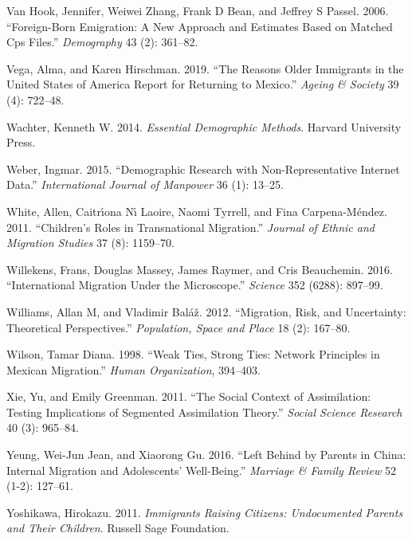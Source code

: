 \documentclass[
]{article}
\begin{document}
\leavevmode\hypertarget{ref-van2006foreign}{}%
Van Hook, Jennifer, Weiwei Zhang, Frank D Bean, and Jeffrey S Passel.
2006. ``Foreign-Born Emigration: A New Approach and Estimates Based on
Matched Cps Files.'' \emph{Demography} 43 (2): 361--82.

\leavevmode\hypertarget{ref-vega2019reasons}{}%
Vega, Alma, and Karen Hirschman. 2019. ``The Reasons Older Immigrants in
the United States of America Report for Returning to Mexico.''
\emph{Ageing \& Society} 39 (4): 722--48.

\leavevmode\hypertarget{ref-wachter2014essential}{}%
Wachter, Kenneth W. 2014. \emph{Essential Demographic Methods}. Harvard
University Press.

\leavevmode\hypertarget{ref-weber2015demographic}{}%
Weber, Ingmar. 2015. ``Demographic Research with Non-Representative
Internet Data.'' \emph{International Journal of Manpower} 36 (1):
13--25.

\leavevmode\hypertarget{ref-white2011children}{}%
White, Allen, Caitrı́ona Nı́ Laoire, Naomi Tyrrell, and Fina
Carpena-Méndez. 2011. ``Children's Roles in Transnational Migration.''
\emph{Journal of Ethnic and Migration Studies} 37 (8): 1159--70.

\leavevmode\hypertarget{ref-willekens2016international}{}%
Willekens, Frans, Douglas Massey, James Raymer, and Cris Beauchemin.
2016. ``International Migration Under the Microscope.'' \emph{Science}
352 (6288): 897--99.

\leavevmode\hypertarget{ref-williams2012migration}{}%
Williams, Allan M, and Vladimir Baláž. 2012. ``Migration, Risk, and
Uncertainty: Theoretical Perspectives.'' \emph{Population, Space and
Place} 18 (2): 167--80.

\leavevmode\hypertarget{ref-wilson1998weak}{}%
Wilson, Tamar Diana. 1998. ``Weak Ties, Strong Ties: Network Principles
in Mexican Migration.'' \emph{Human Organization}, 394--403.

\leavevmode\hypertarget{ref-xie2011social}{}%
Xie, Yu, and Emily Greenman. 2011. ``The Social Context of Assimilation:
Testing Implications of Segmented Assimilation Theory.'' \emph{Social
Science Research} 40 (3): 965--84.

\leavevmode\hypertarget{ref-yeung2016left}{}%
Yeung, Wei-Jun Jean, and Xiaorong Gu. 2016. ``Left Behind by Parents in
China: Internal Migration and Adolescents' Well-Being.'' \emph{Marriage
\& Family Review} 52 (1-2): 127--61.

\leavevmode\hypertarget{ref-yoshikawa2011immigrants}{}%
Yoshikawa, Hirokazu. 2011. \emph{Immigrants Raising Citizens:
Undocumented Parents and Their Children}. Russell Sage Foundation.
\end{document}
